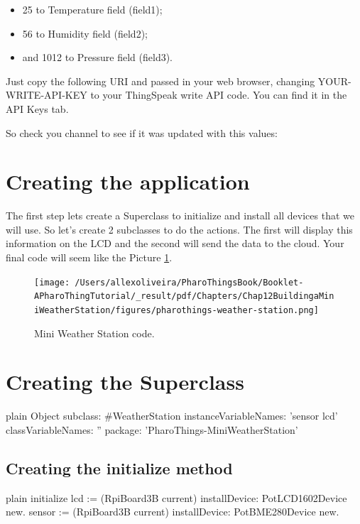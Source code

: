 \documentclass[10pt,twoside,english]{_support/latex/sbabook/sbabook}
\begin{document}
\begin{itemize}
\item 25 to Temperature field (field1);
\item 56 to Humidity field (field2);
\item and 1012 to Pressure field (field3).
\end{itemize}

Just copy the following URI and passed in your web browser, changing YOUR-WRITE-API-KEY to your ThingSpeak write API code. You can find it in the API Keys tab. 


So check you channel to see if it was updated with this values:

\section{Creating the application}
The first step lets create a Superclass to initialize and install all devices that we will use. So let's create 2 subclasses to do the actions. The first will display this information on the LCD and the second will send the data to the cloud. Your final code will seem like the Picture \ref{MiniWeatherStationcode}.


\begin{figure}

\begin{center}
\texttt{[image: /Users/allexoliveira/PharoThingsBook/Booklet-APharoThingTutorial/\_result/pdf/Chapters/Chap12BuildingaMiniWeatherStation/figures/pharothings-weather-station.png]}\caption{Mini Weather Station code.\label{MiniWeatherStationcode}}\end{center}
\end{figure}

\section{Creating the Superclass}
\begin{displaycode}{plain}
Object subclass: #WeatherStation
    instanceVariableNames: 'sensor lcd'
    classVariableNames: ''
    package: 'PharoThings-MiniWeatherStation'
\end{displaycode}
\subsection{Creating the initialize method}
\begin{displaycode}{plain}
initialize
lcd := (RpiBoard3B current) installDevice: PotLCD1602Device  new.
sensor := (RpiBoard3B current) installDevice: PotBME280Device new. 
\end{displaycode}
\end{document}
